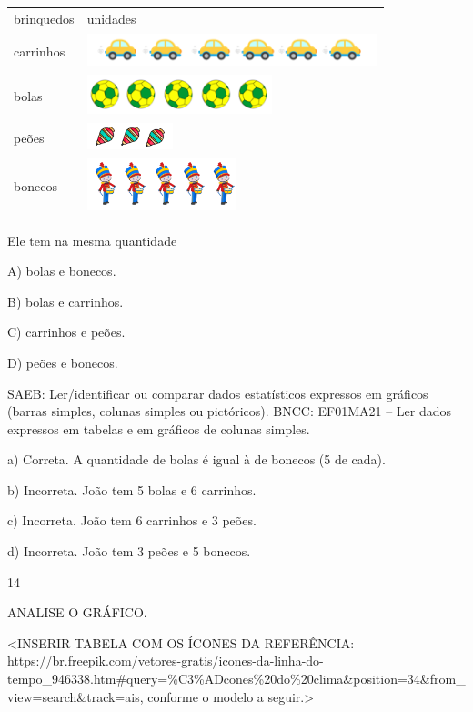 \begin{longtable}[]{@{}ll@{}}
\toprule
brinquedos & unidades\tabularnewline
carrinhos &
\includegraphics[width=3.32338in,height=0.38547in]{media/image129.png}\tabularnewline
bolas &
\includegraphics[width=2.12138in,height=0.44045in]{media/image132.png}\tabularnewline
peões &
\includegraphics[width=0.97976in,height=0.30538in]{media/image134.png}\tabularnewline
bonecos &
\includegraphics[width=1.70172in,height=0.60128in]{media/image135.png}\tabularnewline
\bottomrule
\end{longtable}

Ele tem na mesma quantidade

A) bolas e bonecos.

B) bolas e carrinhos.

C) carrinhos e peões.

D) peões e bonecos.

SAEB: Ler/identificar ou comparar dados estatísticos expressos
em gráficos (barras simples, colunas simples ou pictóricos).
BNCC: EF01MA21 -- Ler dados expressos em tabelas e em gráficos de colunas
simples.

a) Correta. A quantidade de bolas é igual à de bonecos (5 de cada).

b) Incorreta. João tem 5 bolas e 6 carrinhos.

c) Incorreta. João tem 6 carrinhos e 3 peões.

d) Incorreta. João tem 3 peões e 5 bonecos.

\num{14}

ANALISE O GRÁFICO.

\textless{}INSERIR TABELA COM OS ÍCONES DA REFERÊNCIA:
https://br.freepik.com/vetores-gratis/icones-da-linha-do-tempo\_946338.htm\#query=\%C3\%ADcones\%20do\%20clima\&position=34\&from\_view=search\&track=ais,
conforme o modelo a seguir.\textgreater{}

